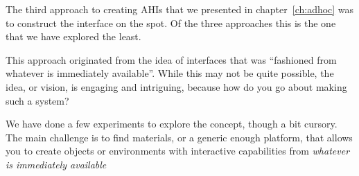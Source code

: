 The third approach to creating AHIs that we presented in chapter~\ref{ch:adhoc} was to construct the interface on the spot.
Of the three approaches this is the one that we have explored the least.

This approach originated from the idea of interfaces that was ``fashioned from whatever is immediately available''.
While this may not be quite possible, the idea, or vision, is engaging and intriguing, because how do you go about making such a system?

We have done a few experiments to explore the concept, though a bit cursory.
The main challenge is to find materials, or a generic enough platform, that allows you to create objects or environments with interactive capabilities from \emph{whatever is immediately available} 